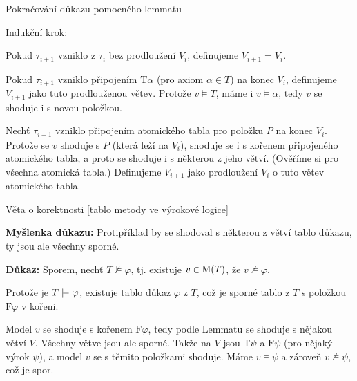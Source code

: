 \documentclass{beamer}
\begin{document}
\begin{frame}{Pokračování důkazu pomocného lemmatu}

    \alert{Indukční krok:}
    
    Pokud $\tau_{i+1}$ vzniklo z $\tau_i$ bez prodloužení $V_i$, definujeme $V_{i+1}=V_i$.

    \medskip

    Pokud $\tau_{i+1}$ vzniklo připojením $\mathrm{T}\alpha$ (pro axiom $\alpha\in T$) na konec $V_i$, definujeme $V_{i+1}$ jako tuto prodlouženou větev. Protože $v\models T$, máme i $v\models\alpha$, tedy $v$ se shoduje i s novou položkou.
    
    \medskip

     Nechť $\tau_{i+1}$ vzniklo připojením atomického tabla pro položku $P$ na konec $V_i$. Protože se $v$ shoduje s $P$ (která leží na $V_i$), shoduje se i s kořenem připojeného atomického tabla, a proto se shoduje i s některou z jeho větví. (Ověříme si pro všechna atomická tabla.) Definujeme $V_{i+1}$ jako prodloužení $V_i$ o tuto větev atomického tabla.\hfill\qedsymbol

\end{frame}


\begin{frame}{Věta o korektnosti [tablo metody ve výrokové logice]}


    \medskip

    \textbf{Myšlenka důkazu:} Protipříklad by se shodoval s některou z větví tablo důkazu, ty jsou ale všechny sporné.

    \medskip

    \textbf{Důkaz:} Sporem, nechť $T\not\models\varphi$, tj. existuje $v\in\operatorname{M}(T)$, že $v\not\models\varphi$.
        
    Protože je $T\proves\varphi$, existuje tablo důkaz $\varphi$ z $T$, což je sporné tablo z $T$ s položkou $\mathrm{F}\varphi$ v kořeni. 
        
    Model $v$ se shoduje s kořenem $\mathrm{F}\varphi$, tedy podle Lemmatu se shoduje s nějakou větví $V$. Všechny větve jsou ale sporné. Takže na $V$ jsou $\mathrm{T}\psi$ a $\mathrm{F}\psi$ (pro nějaký výrok $\psi$), a model $v$ se s těmito položkami shoduje. Máme $v\models\psi$ a zároveň $v\not\models\psi$, což je spor.\hfill\qedsymbol

\end{frame}
\end{document}
